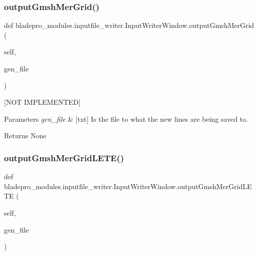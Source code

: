\subsubsection{\texorpdfstring{output\+Gmsh\+Mer\+Grid()}{outputGmshMerGrid()}}
{\footnotesize\ttfamily def bladepro\+\_\+modules.\+inputfile\+\_\+writer.\+Input\+Writer\+Window.\+output\+Gmsh\+Mer\+Grid (\begin{DoxyParamCaption}\item[{}]{self,  }\item[{}]{gen\+\_\+file }\end{DoxyParamCaption})}



\mbox{[}N\+OT I\+M\+P\+L\+E\+M\+E\+N\+T\+ED\mbox{]} 


\begin{DoxyParams}{Parameters}
{\em gen\+\_\+file} & \mbox{[}txt\mbox{]} Is the file to what the new lines are being saved to. \\
\hline
\end{DoxyParams}
\begin{DoxyReturn}{Returns}
None 
\end{DoxyReturn}
\hypertarget{classbladepro__modules_1_1inputfile__writer_1_1_input_writer_window_a36211b3ff2243e25921e48d71b9dcf7c}{}\label{classbladepro__modules_1_1inputfile__writer_1_1_input_writer_window_a36211b3ff2243e25921e48d71b9dcf7c} 
\subsubsection{\texorpdfstring{output\+Gmsh\+Mer\+Grid\+L\+E\+T\+E()}{outputGmshMerGridLETE()}}
{\footnotesize\ttfamily def bladepro\+\_\+modules.\+inputfile\+\_\+writer.\+Input\+Writer\+Window.\+output\+Gmsh\+Mer\+Grid\+L\+E\+TE (\begin{DoxyParamCaption}\item[{}]{self,  }\item[{}]{gen\+\_\+file }\end{DoxyParamCaption})}



